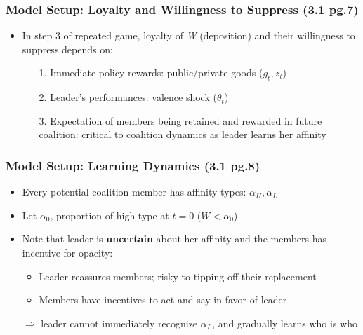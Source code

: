 \documentclass[10pt,handout]{beamer}
\begin{document}
\begin{frame}
\frametitle{Model Setup: Loyalty and Willingness to Suppress (3.1 pg.7)}
\begin{itemize}
    \item In step 3 of repeated game, loyalty of \textit{W} (deposition) and their willingness to suppress depends on:
    \begin{itemize}
        \item[1.] Immediate policy rewards: public/private goods ($g_t, z_t$)
        \item[2.] Leader's performances: valence shock ($\theta_t$)
        \item[3.] Expectation of members being retained and rewarded in future coalition: critical to coalition dynamics as leader learns her affinity
    \end{itemize}
\end{itemize}
\end{frame}

\begin{frame}
\frametitle{Model Setup: Learning Dynamics (3.1 pg.8)}
\begin{itemize}
    \item Every potential coalition member has affinity types: $\alpha_H, \alpha_L$
    \item Let $\alpha_0$, proportion of high type at $t = 0$ ($W < \alpha_0$)
    \item Note that leader is \textbf{uncertain} about her affinity and the members has incentive for opacity:
    \begin{itemize}
        \item Leader reassures members; risky to tipping off their replacement
        \item Members have incentives to act and say in favor of leader
    \end{itemize}
    \item[] $\Rightarrow$ leader cannot immediately recognize $\alpha_L$, and gradually learns who is who
\end{itemize}
\end{frame}
\end{document}
